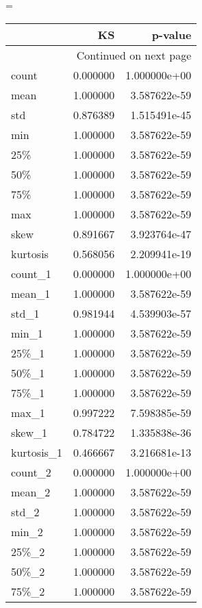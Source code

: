 \LTcapwidth=\textwidth
\begin{longtable}{lrr}
\toprule
{} &        KS &       p-value \\
\midrule
\endhead
\midrule
\multicolumn{3}{r}{{Continued on next page}} \\
\midrule
\endfoot

\bottomrule
\endlastfoot
count      &  0.000000 &  1.000000e+00 \\
mean       &  1.000000 &  3.587622e-59 \\
std        &  0.876389 &  1.515491e-45 \\
min        &  1.000000 &  3.587622e-59 \\
25\%        &  1.000000 &  3.587622e-59 \\
50\%        &  1.000000 &  3.587622e-59 \\
75\%        &  1.000000 &  3.587622e-59 \\
max        &  1.000000 &  3.587622e-59 \\
skew       &  0.891667 &  3.923764e-47 \\
kurtosis   &  0.568056 &  2.209941e-19 \\
count\_1    &  0.000000 &  1.000000e+00 \\
mean\_1     &  1.000000 &  3.587622e-59 \\
std\_1      &  0.981944 &  4.539903e-57 \\
min\_1      &  1.000000 &  3.587622e-59 \\
25\%\_1      &  1.000000 &  3.587622e-59 \\
50\%\_1      &  1.000000 &  3.587622e-59 \\
75\%\_1      &  1.000000 &  3.587622e-59 \\
max\_1      &  0.997222 &  7.598385e-59 \\
skew\_1     &  0.784722 &  1.335838e-36 \\
kurtosis\_1 &  0.466667 &  3.216681e-13 \\
count\_2    &  0.000000 &  1.000000e+00 \\
mean\_2     &  1.000000 &  3.587622e-59 \\
std\_2      &  1.000000 &  3.587622e-59 \\
min\_2      &  1.000000 &  3.587622e-59 \\
25\%\_2      &  1.000000 &  3.587622e-59 \\
50\%\_2      &  1.000000 &  3.587622e-59 \\
75\%\_2      &  1.000000 &  3.587622e-59 \\

\end{longtable}
